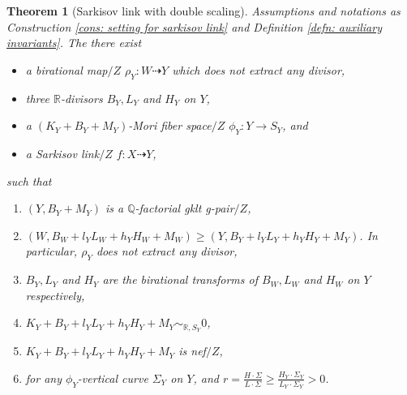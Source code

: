 \documentclass[11pt]{amsart}
\numberwithin{equation}{section}
\newcommand{\Qq}{\mathbb{Q}}
\newcommand{\Rr}{\mathbb{R}}
\newtheorem{thm}{Theorem}[section]
\theoremstyle{definition}
\theoremstyle{remark}
\theoremstyle{definition}
\begin{document}
\begin{thm}[Sarkisov link with double scaling]\label{thm: scaling sarkisov}
Assumptions and notations as Construction \ref{cons: setting for sarkisov link} and Definition \ref{defn: auxiliary invariants}. The there exist
\begin{itemize}
    \item a birational map$/Z$ $\rho_Y: W\dashrightarrow Y$ which does not extract any divisor,
    \item three $\Rr$-divisors $B_Y,L_Y$ and $H_Y$ on $Y$,
    \item a $(K_Y+B_Y+M_Y)$-Mori fiber space$/Z$ $\phi_Y:Y\rightarrow S_Y$, and
    \item a Sarkisov link$/Z$ $f: X\dashrightarrow Y$,
\end{itemize}
such that
\begin{enumerate}
\item $(Y,B_Y+M_Y)$ is a $\Qq$-factorial gklt g-pair$/Z$,
    \item $(W,B_W+l_YL_W+h_YH_W+M_W)\geq (Y,B_Y+l_YL_Y+h_YH_Y+M_Y)$. In particular, $\rho_Y$ does not extract any divisor,
    \item $B_Y,L_Y$ and $H_Y$ are the birational transforms of $B_W,L_W$ and $H_W$ on $Y$ respectively,
    \item $K_Y+B_Y+l_YL_Y+h_YH_Y+M_Y\sim_{\Rr,S_Y}0$, 
    \item $K_Y+B_Y+l_YL_Y+h_YH_Y+M_Y$ is nef$/Z$, 
    \item for any $\phi_Y$-vertical curve $\Sigma_Y$ on $Y$, and $r=\frac{H\cdot\Sigma}{L\cdot\Sigma}\geq\frac{H_Y\cdot\Sigma_Y}{L_Y\cdot\Sigma_Y}>0$.
\end{enumerate}
\end{thm}
\end{document}
